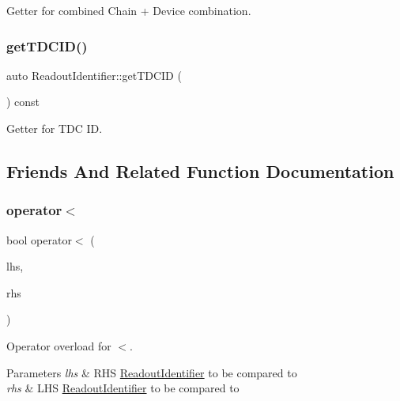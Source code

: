 Getter for combined Chain + Device combination. 

\mbox{\label{class_readout_identifier_a17ec929ed43ac36bf7913ba2ad316f2f}} 
\subsubsection{\texorpdfstring{get\+T\+D\+C\+I\+D()}{getTDCID()}}
{\footnotesize\ttfamily auto Readout\+Identifier\+::get\+T\+D\+C\+ID (\begin{DoxyParamCaption}{ }\end{DoxyParamCaption}) const\hspace{0.3cm}{\ttfamily [inline]}}



Getter for T\+DC ID. 



\subsection{Friends And Related Function Documentation}
\mbox{\label{class_readout_identifier_aa0d096b09bfc6a21f2c29ec777e101f8}} 
\subsubsection{\texorpdfstring{operator$<$}{operator<}}
{\footnotesize\ttfamily bool operator$<$ (\begin{DoxyParamCaption}\item[{const \hyperlink{class_readout_identifier}{Readout\+Identifier} \&}]{lhs,  }\item[{const \hyperlink{class_readout_identifier}{Readout\+Identifier} \&}]{rhs }\end{DoxyParamCaption})\hspace{0.3cm}{\ttfamily [friend]}}



Operator overload for $<$. 


\begin{DoxyParams}{Parameters}
{\em lhs} & R\+HS \hyperlink{class_readout_identifier}{Readout\+Identifier} to be compared to \\
\hline
{\em rhs} & L\+HS \hyperlink{class_readout_identifier}{Readout\+Identifier} to be compared to \\
\hline
\end{DoxyParams}
\mbox{\label{class_readout_identifier_a62474a342fbe3d79da5b8a869d95e72e}} 

